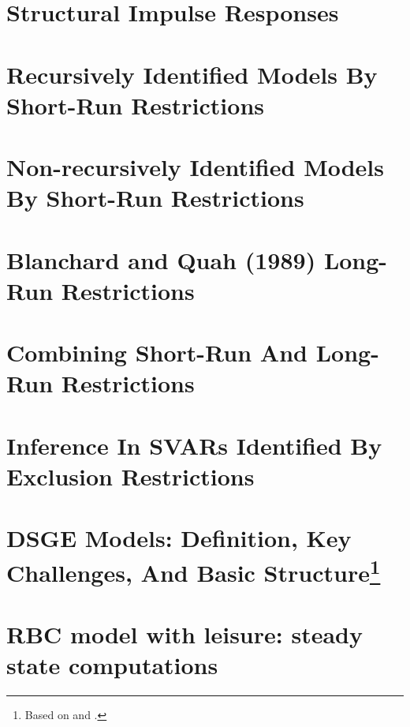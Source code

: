 \documentclass[a4paper]{scrartcl}
\newif\ifpartDSGE
\begin{document}
    \section{Structural Impulse Responses}
    
    
    \section{Recursively Identified Models By Short-Run Restrictions}
    
    
    \section{Non-recursively Identified Models By Short-Run Restrictions}
    
    
    \section{Blanchard and Quah (1989) Long-Run Restrictions}
    
    
    \section{Combining Short-Run And Long-Run Restrictions}
    
    
    \section{Inference In SVARs Identified By Exclusion Restrictions}
    
\fi


\ifpartDSGE
    \section[DSGE Models: Definition, Key Challenges, And Basic Structure]{DSGE Models: Definition, Key Challenges, And Basic Structure\footnote{Based on \citet[Ch.~1]{Torres.2015} and \citet{FVRRS.2016}.}}
    
    
    \section{RBC model with leisure: steady state computations}
    
    
\end{document}
